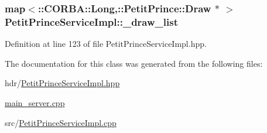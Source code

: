 \subsubsection[{\texorpdfstring{\+\_\+draw\+\_\+list}{_draw_list}}]{\setlength{\rightskip}{0pt plus 5cm}map$<$\+::C\+O\+R\+B\+A\+::\+Long,\+::Petit\+Prince\+::\+Draw $\ast$ $>$ Petit\+Prince\+Service\+Impl\+::\+\_\+draw\+\_\+list\hspace{0.3cm}{\ttfamily [static]}}\hypertarget{class_petit_prince_service_impl_ac469e25a69375c26d3d6ec514fc7bb5b}{}\label{class_petit_prince_service_impl_ac469e25a69375c26d3d6ec514fc7bb5b}


Definition at line 123 of file Petit\+Prince\+Service\+Impl.\+hpp.



The documentation for this class was generated from the following files\+:\begin{DoxyCompactItemize}
\item 
hdr/\hyperlink{_petit_prince_service_impl_8hpp}{Petit\+Prince\+Service\+Impl.\+hpp}\item 
\hyperlink{main__server_8cpp}{main\+\_\+server.\+cpp}\item 
src/\hyperlink{_petit_prince_service_impl_8cpp}{Petit\+Prince\+Service\+Impl.\+cpp}\end{DoxyCompactItemize}
